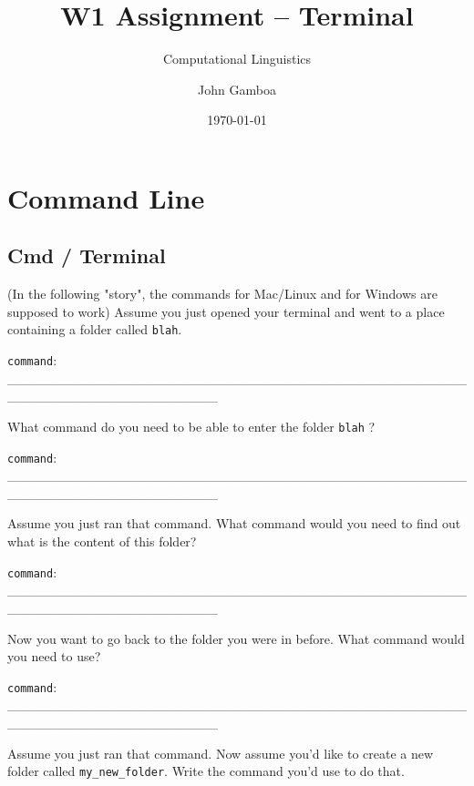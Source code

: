 \documentclass[a4paper,11pt]{scrartcl}
\title{W1 Assignment -- Terminal}
\subtitle{Computational Linguistics}
\author{John Gamboa}
\date{\today}
\begin{document}
\maketitle

\section{Command Line}

\subsection{Cmd / Terminal}

(In the following "story", the commands for Mac/Linux and for Windows are
supposed to work)
Assume you just opened your terminal and went to a place containing a folder
called \verb|blah|.

\verb|command|: \_\_\_\_\_\_\_\_\_\_\_\_\_\_\_\_\_\_\_\_\_\_\_\_\_\_\_\_\_\_\_\_\_\_\_\_\_\_\_\_\_\_\_\_\_\_\_\_\_\_\_\_\_\_\_\_\_\_\_\_\_\_\_\_\_\_\_\_\_\_

What command do you need to be able to enter the folder \verb|blah| ?

\verb|command|: \_\_\_\_\_\_\_\_\_\_\_\_\_\_\_\_\_\_\_\_\_\_\_\_\_\_\_\_\_\_\_\_\_\_\_\_\_\_\_\_\_\_\_\_\_\_\_\_\_\_\_\_\_\_\_\_\_\_\_\_\_\_\_\_\_\_\_\_\_\_

Assume you just ran that command. What command would you need to find out what
is the content of this folder?

\verb|command|: \_\_\_\_\_\_\_\_\_\_\_\_\_\_\_\_\_\_\_\_\_\_\_\_\_\_\_\_\_\_\_\_\_\_\_\_\_\_\_\_\_\_\_\_\_\_\_\_\_\_\_\_\_\_\_\_\_\_\_\_\_\_\_\_\_\_\_\_\_\_

Now you want to go back to the folder you were in before. What command would you
need to use?

\verb|command|: \_\_\_\_\_\_\_\_\_\_\_\_\_\_\_\_\_\_\_\_\_\_\_\_\_\_\_\_\_\_\_\_\_\_\_\_\_\_\_\_\_\_\_\_\_\_\_\_\_\_\_\_\_\_\_\_\_\_\_\_\_\_\_\_\_\_\_\_\_\_

Assume you just ran that command. Now assume you'd like to create a new folder
called \verb|my_new_folder|. Write the command you'd use to do that.
\end{document}
